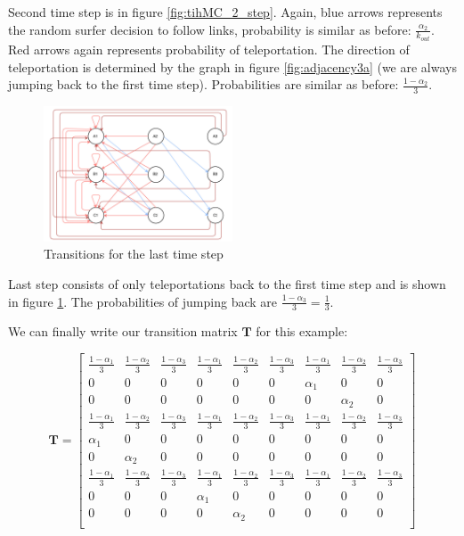 \documentclass{article}
\begin{document}
Second time step is in figure \ref{fig:tihMC_2_step}. Again, blue arrows represents the random surfer decision to follow links, probability is similar as before:  $\frac{\alpha_2}{k_{out}}$. Red arrows again represents probability of teleportation. The direction of teleportation is determined by the graph in figure \ref{fig:adjacency3a} (we are always jumping back to the first time step). Probabilities are similar as before: $\frac{1-\alpha_2}{3}$.


\begin{figure}
\centering
\includegraphics[width=0.5\textwidth]{tihMC_3_step}
\caption{Transitions for the last time step}
\label{fig:tihMC_3_step}
\end{figure}

Last step consists of only teleportations back to the first time step and is shown in figure \ref{fig:tihMC_3_step}. The probabilities of jumping back are $\frac{1-\alpha_3}{3} = \frac{1}{3}$.

We can finally write our transition matrix $\mathbf{T}$ for this example:

\[\mathbf{T}=
\begin{bmatrix}
    \frac{1-\alpha_1}{3} &  \frac{1-\alpha_2}{3} & \frac{1-\alpha_3}{3} & \frac{1-\alpha_1}{3} &  \frac{1-\alpha_2}{3} & \frac{1-\alpha_3}{3} & \frac{1-\alpha_1}{3} &  \frac{1-\alpha_2}{3} & \frac{1-\alpha_3}{3} \\
    0 & 0 & 0 & 0 & 0 & 0 & \alpha_1 & 0 & 0 \\
    0 & 0 & 0 & 0 & 0 & 0 & 0 & \alpha_2 & 0 \\
        \frac{1-\alpha_1}{3} &  \frac{1-\alpha_2}{3} & \frac{1-\alpha_3}{3} & \frac{1-\alpha_1}{3} &  \frac{1-\alpha_2}{3} & \frac{1-\alpha_3}{3} & \frac{1-\alpha_1}{3} &  \frac{1-\alpha_2}{3} & \frac{1-\alpha_3}{3} \\
	    \alpha_1 & 0 & 0 & 0 & 0 & 0 & 0 & 0 & 0 \\
	   0 & \alpha_2 & 0 & 0 & 0 & 0 & 0 & 0 & 0 \\
        \frac{1-\alpha_1}{3} &  \frac{1-\alpha_2}{3} & \frac{1-\alpha_3}{3} & \frac{1-\alpha_1}{3} &  \frac{1-\alpha_2}{3} & \frac{1-\alpha_3}{3} & \frac{1-\alpha_1}{3} &  \frac{1-\alpha_2}{3} & \frac{1-\alpha_3}{3} \\
		  0 & 0 & 0 & \alpha_1 & 0 & 0 & 0 & 0 & 0 \\
		  0 & 0 & 0 & 0 & \alpha_2 & 0 & 0 & 0 & 0 \\

\end{bmatrix}
\]
\end{document}
